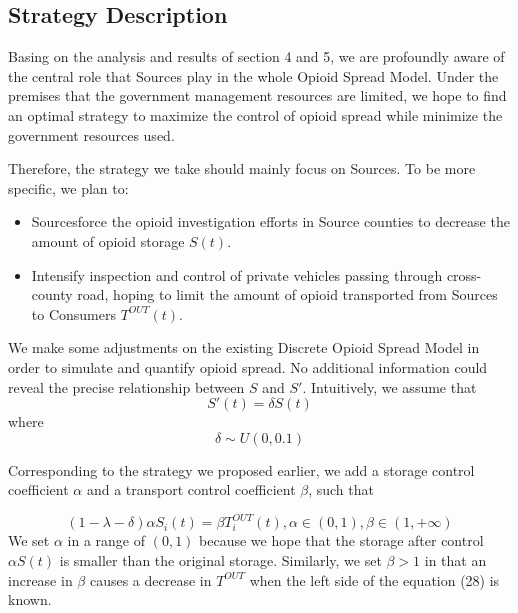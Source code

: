 \subsection{Strategy Description}
Basing on the analysis and results of section 4 and 5, we are profoundly aware of the central role that Sources play in the whole Opioid Spread Model. Under the premises that the government management resources are limited, we hope to find an optimal strategy to maximize the control of opioid spread while minimize the government resources used. 

Therefore, the strategy we take should mainly focus on Sources. To be more specific, we plan to:
\begin{itemize}
	\item Sourcesforce the opioid investigation efforts in Source counties to decrease the amount of opioid storage $S(t)$.
	\item Intensify inspection and control of private vehicles passing through cross-county road, hoping to limit the amount of opioid transported from Sources to Consumers $T^{OUT}(t)$.
\end{itemize}

We make some adjustments on the existing Discrete Opioid Spread Model in order to simulate and quantify opioid spread. No additional information could reveal the precise relationship between  $S$ and $S'$. Intuitively, we assume that 
\begin{equation}
S'(t) = \delta S(t)
\end{equation}
where
\begin{equation}
\delta \sim U(0, 0.1)
\end{equation}

Corresponding to the strategy we proposed earlier, we add a storage control coefficient $\alpha$ and a transport control coefficient $\beta$, such that
\begin{comment}
\begin{equation}
\alpha S_i(t) - S_i'(t) = \lambda S_i(t) + \beta T_i^{OUT}(t), \alpha\in (0,1), \beta \in (1, +\infty)
\end{equation}
Combining (23-25), we have
\end{comment}
\begin{equation}
(1 - \lambda - \delta)\alpha S_i(t) = \beta T_i^{OUT}(t), \alpha\in (0,1), \beta \in (1, +\infty)
\end{equation}
We set $\alpha$ in a range of $(0,1)$ because we hope that the storage after control $\alpha S(t)$ is smaller than the original storage. Similarly, we set $\beta > 1$ in that an increase in $\beta$ causes a decrease in $T^{OUT}$ when the left side of the equation (28) is known.

